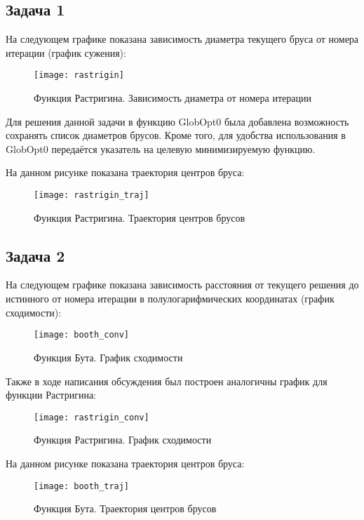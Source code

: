 \subsection{Задача 1}

На следующем графике показана зависимость диаметра текущего бруса от номера итерации (график сужения):

\begin{figure}[H]
	\begin{center}
		\texttt{[image: rastrigin]}
		\label{pic:rasstrigin_constriction}
		\caption{Функция Растригина. Зависимость диаметра от номера итерации}
	\end{center}
\end{figure}

Для решения данной задачи в функцию GlobOpt0 была добавлена возможность сохранять список диаметров брусов. Кроме того, для удобства использования в GlobOpt0 передаётся указатель на целевую минимизируемую функцию.

На данном рисунке показана траектория центров бруса:

\begin{figure}[H]
	\begin{center}
		\texttt{[image: rastrigin\_traj]}
		\label{pic:rastrigin_traj}
		\caption{Функция Растригина. Траектория центров брусов}
	\end{center}
\end{figure}

\subsection{Задача 2}
На следующем графике показана зависимость расстояния от текущего решения до истинного от номера итерации в полулогарифмических координатах (график сходимости):

\begin{figure}[H]
	\begin{center}
		\texttt{[image: booth\_conv]}
		\label{pic:booth_conv}
		\caption{Функция Бута. График сходимости}
	\end{center}
\end{figure}

Также в ходе написания обсуждения был построен аналогичны график для функции Растригина:

\begin{figure}[H]
	\begin{center}
		\texttt{[image: rastrigin\_conv]}
		\label{pic:rastrigin_conv}
		\caption{Функция Растригина. График сходимости}
	\end{center}
\end{figure}

На данном рисунке показана траектория центров бруса:

\begin{figure}[H]
	\begin{center}
		\texttt{[image: booth\_traj]}
		\label{pic:booth_traj}
		\caption{Функция Бута. Траектория центров брусов}
	\end{center}
\end{figure}
